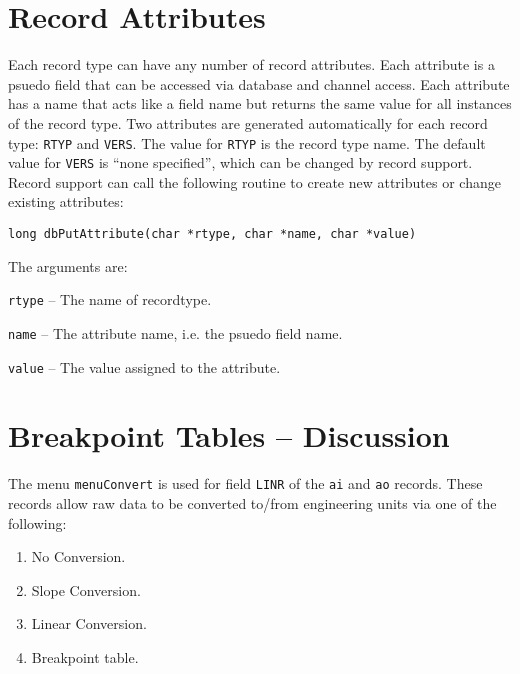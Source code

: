 \section{Record Attributes}

Each record type can have any number of record attributes.
Each attribute is a psuedo field that can be accessed via database and channel access.
Each attribute has a name that acts like a field name but returns the same value for all instances of the record type.
Two attributes are generated automatically for each record type: \verb|RTYP| and \verb|VERS|.
The value for \verb|RTYP| is the record type name.
The default value for \verb|VERS| is ``none specified'', which can be changed by record support.
Record support can call the following routine to create new attributes or change existing attributes:

\begin{verbatim}
long dbPutAttribute(char *rtype, char *name, char *value)
\end{verbatim}

The arguments are:

\begin{description}
\item \verb|rtype| -- The name of recordtype.
\item \verb|name| -- The attribute name, i.e. the psuedo field name.
\item \verb|value| -- The value assigned to the attribute.
\end{description}

\section{Breakpoint Tables -- Discussion}

The menu \verb|menuConvert| is used for field \verb|LINR| of the \verb|ai| and \verb|ao| records.
These records allow raw data to be converted to/from engineering units via one of the following:

\begin{enumerate}
\item No Conversion.
\item {}Slope Conversion.
\item {}Linear Conversion.
\item Breakpoint table.
\end{enumerate}


